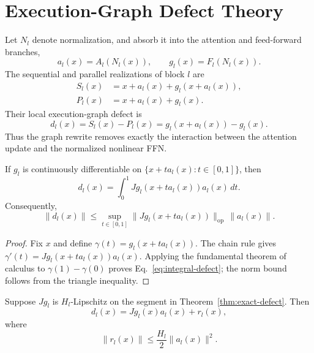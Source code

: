 \section{Execution-Graph Defect Theory}
\label{sec:theory}

Let $N_l$ denote normalization, and absorb it into the attention and feed-forward branches,
\begin{equation}
  a_l(x)=A_l(N_l(x)),\qquad g_l(x)=F_l(N_l(x)).
\end{equation}
The sequential and parallel realizations of block $l$ are
\begin{align}
  S_l(x)&=x+a_l(x)+g_l(x+a_l(x)),\\
  P_l(x)&=x+a_l(x)+g_l(x).
\end{align}
Their local execution-graph defect is
\begin{equation}
  d_l(x)=S_l(x)-P_l(x)=g_l(x+a_l(x))-g_l(x).
  \label{eq:local-defect}
\end{equation}
Thus the graph rewrite removes exactly the interaction between the attention update and the normalized nonlinear FFN.

\begin{theorem}
\label{thm:exact-defect}
If $g_l$ is continuously differentiable on $\{x+t a_l(x):t\in[0,1]\}$, then
\begin{equation}
  d_l(x)=\int_0^1 Jg_l(x+t a_l(x))a_l(x)\,dt.
  \label{eq:integral-defect}
\end{equation}
Consequently,
\begin{equation}
  \|d_l(x)\|\le
  \sup_{t\in[0,1]}\|Jg_l(x+t a_l(x))\|_{\mathrm{op}}\,\|a_l(x)\|.
\end{equation}
\end{theorem}

\begin{proof}
Fix $x$ and define $\gamma(t)=g_l(x+t a_l(x))$. The chain rule gives $\gamma'(t)=Jg_l(x+t a_l(x))a_l(x)$. Applying the fundamental theorem of calculus to $\gamma(1)-\gamma(0)$ proves Eq.~\eqref{eq:integral-defect}; the norm bound follows from the triangle inequality.
\end{proof}

\begin{theorem}
\label{thm:taylor-defect}
Suppose $Jg_l$ is $H_l$-Lipschitz on the segment in Theorem~\ref{thm:exact-defect}. Then
\begin{equation}
  d_l(x)=Jg_l(x)a_l(x)+r_l(x),
\end{equation}
where
\begin{equation}
  \|r_l(x)\|\le \frac{H_l}{2}\|a_l(x)\|^2.
\end{equation}
\end{theorem}

